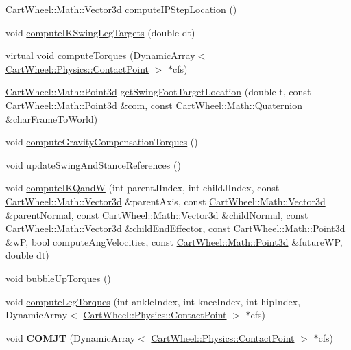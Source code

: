 \begin{DoxyCompactItemize}
\item 
\hyperlink{classCartWheel_1_1Math_1_1Vector3d}{CartWheel::Math::Vector3d} \hyperlink{classCartWheel_1_1Core_1_1IKVMCController_a0fe1ad56b05f7b16ed0f3b7421056b4b}{computeIPStepLocation} ()
\item 
void \hyperlink{classCartWheel_1_1Core_1_1IKVMCController_a02acf83feb698c0e35a81db2c5b8b788}{computeIKSwingLegTargets} (double dt)
\item 
virtual void \hyperlink{classCartWheel_1_1Core_1_1IKVMCController_a0a944ad3c3178ecc74488c1697460883}{computeTorques} (DynamicArray$<$ \hyperlink{classCartWheel_1_1Physics_1_1ContactPoint}{CartWheel::Physics::ContactPoint} $>$ $\ast$cfs)
\item 
\hyperlink{classCartWheel_1_1Math_1_1Point3d}{CartWheel::Math::Point3d} \hyperlink{classCartWheel_1_1Core_1_1IKVMCController_aa9be3a191f084f2bfbf1c766be3386f0}{getSwingFootTargetLocation} (double t, const \hyperlink{classCartWheel_1_1Math_1_1Point3d}{CartWheel::Math::Point3d} \&com, const \hyperlink{classCartWheel_1_1Math_1_1Quaternion}{CartWheel::Math::Quaternion} \&charFrameToWorld)
\item 
void \hyperlink{classCartWheel_1_1Core_1_1IKVMCController_a8364bad704f18fcb36eef6d0d4fd9e16}{computeGravityCompensationTorques} ()
\item 
void \hyperlink{classCartWheel_1_1Core_1_1IKVMCController_a2013dc539ffd677c3e3e7f890290eed0}{updateSwingAndStanceReferences} ()
\item 
void \hyperlink{classCartWheel_1_1Core_1_1IKVMCController_a6e379111a67bc1fae067aa643dc2b5a8}{computeIKQandW} (int parentJIndex, int childJIndex, const \hyperlink{classCartWheel_1_1Math_1_1Vector3d}{CartWheel::Math::Vector3d} \&parentAxis, const \hyperlink{classCartWheel_1_1Math_1_1Vector3d}{CartWheel::Math::Vector3d} \&parentNormal, const \hyperlink{classCartWheel_1_1Math_1_1Vector3d}{CartWheel::Math::Vector3d} \&childNormal, const \hyperlink{classCartWheel_1_1Math_1_1Vector3d}{CartWheel::Math::Vector3d} \&childEndEffector, const \hyperlink{classCartWheel_1_1Math_1_1Point3d}{CartWheel::Math::Point3d} \&wP, bool computeAngVelocities, const \hyperlink{classCartWheel_1_1Math_1_1Point3d}{CartWheel::Math::Point3d} \&futureWP, double dt)
\item 
void \hyperlink{classCartWheel_1_1Core_1_1IKVMCController_af799a5e27207189e5b946cf063b4667d}{bubbleUpTorques} ()
\item 
void \hyperlink{classCartWheel_1_1Core_1_1IKVMCController_af111c60309fbcb6bd5da03ac95b984f4}{computeLegTorques} (int ankleIndex, int kneeIndex, int hipIndex, DynamicArray$<$ \hyperlink{classCartWheel_1_1Physics_1_1ContactPoint}{CartWheel::Physics::ContactPoint} $>$ $\ast$cfs)
\item 
\hypertarget{classCartWheel_1_1Core_1_1IKVMCController_a7f89f86f5220c61e898c4ca19154068e}{
void {\bfseries COMJT} (DynamicArray$<$ \hyperlink{classCartWheel_1_1Physics_1_1ContactPoint}{CartWheel::Physics::ContactPoint} $>$ $\ast$cfs)}
\label{classCartWheel_1_1Core_1_1IKVMCController_a7f89f86f5220c61e898c4ca19154068e}


\end{DoxyCompactItemize}
